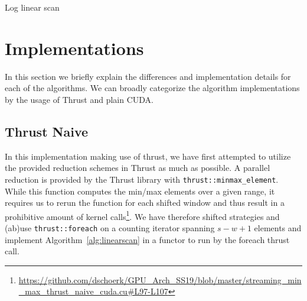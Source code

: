 \begin{algorithm}[H]
    \caption{Log linear scan}
    \label{alg:loglinearscan}
\end{algorithm}

\section{Implementations}
In this section we briefly explain the differences and implementation details for each of the algorithms. We can broadly categorize the algorithm implementations by the usage of Thrust and plain CUDA. 

\subsection{Thrust Naive}
\label{sec:thrust_naive}
In this implementation making use of thrust, we have first attempted to utilize the provided reduction schemes in Thrust as much as possible. A parallel reduction is provided by the Thrust library with \texttt{thrust::minmax\_element}. While this function computes the min/max elements over a given range, it requires us to rerun the function for each shifted window and thus result in a prohibitive amount of kernel calls\footnote{\url{https://github.com/dschoerk/GPU_Arch_SS19/blob/master/streaming\_min\_max\_thrust\_naive\_cuda.cu\#L97-L107}}.  We have therefore shifted strategies and (ab)use \texttt{thrust::foreach} on a counting iterator spanning $s - w + 1$ elements and implement Algorithm~\ref{alg:linearscan} in a functor to run by the foreach thrust call. 

